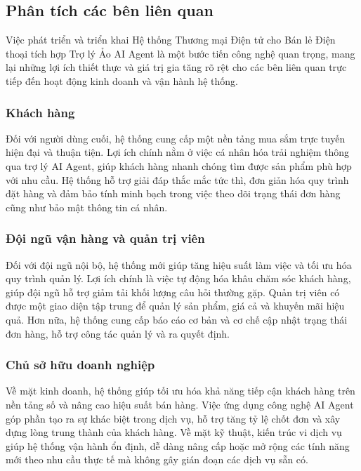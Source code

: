 \subsection{Phân tích các bên liên quan}

Việc phát triển và triển khai Hệ thống Thương mại Điện tử cho Bán lẻ Điện thoại tích hợp Trợ lý Ảo AI Agent là một bước tiến công nghệ quan trọng, mang lại những lợi ích thiết thực và giá trị gia tăng rõ rệt cho các bên liên quan trực tiếp đến hoạt động kinh doanh và vận hành hệ thống. 

\subsubsection{Khách hàng}

Đối với người dùng cuối, hệ thống cung cấp một nền tảng mua sắm trực tuyến hiện đại và thuận tiện. Lợi ích chính nằm ở việc cá nhân hóa trải nghiệm thông qua trợ lý AI Agent, giúp khách hàng nhanh chóng tìm được sản phẩm phù hợp với nhu cầu. Hệ thống hỗ trợ giải đáp thắc mắc tức thì, đơn giản hóa quy trình đặt hàng và đảm bảo tính minh bạch trong việc theo dõi trạng thái đơn hàng cũng như bảo mật thông tin cá nhân.

\subsubsection{Đội ngũ vận hàng và quản trị viên}

Đối với đội ngũ nội bộ, hệ thống mới giúp tăng hiệu suất làm việc và tối ưu hóa quy trình quản lý. Lợi ích chính là việc tự động hóa khâu chăm sóc khách hàng, giúp đội ngũ hỗ trợ giảm tải khối lượng câu hỏi thường gặp. Quản trị viên có được một giao diện tập trung để quản lý sản phẩm, giá cả và khuyến mãi hiệu quả. Hơn nữa, hệ thống cung cấp báo cáo cơ bản và cơ chế cập nhật trạng thái đơn hàng, hỗ trợ công tác quản lý và ra quyết định.

\subsubsection{Chủ sở hữu doanh nghiệp}

Về mặt kinh doanh, hệ thống giúp tối ưu hóa khả năng tiếp cận khách hàng trên nền tảng số và nâng cao hiệu suất bán hàng. Việc ứng dụng công nghệ AI Agent góp phần tạo ra sự khác biệt trong dịch vụ, hỗ trợ tăng tỷ lệ chốt đơn và xây dựng lòng trung thành của khách hàng. Về mặt kỹ thuật, kiến trúc vi dịch vụ giúp hệ thống vận hành ổn định, dễ dàng nâng cấp hoặc mở rộng các tính năng mới theo nhu cầu thực tế mà không gây gián đoạn các dịch vụ sẵn có.

